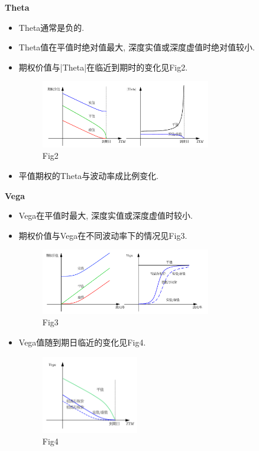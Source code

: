 \documentclass[UTF8]{ctexart}
\begin{document}
\noindent \textbf{Theta} \par 
\begin{itemize}
\item Theta通常是负的.
\item Theta值在平值时绝对值最大, 深度实值或深度虚值时绝对值较小.
\item 期权价值与|Theta|在临近到期时的变化见Fig2.
\begin{figure}[H]
    \centering
    \includegraphics[width=0.7\textwidth]{fig/fig2.png}
    \caption{Fig2}
\end{figure}
\item 平值期权的Theta与波动率成比例变化.
\end{itemize}


\noindent \textbf{Vega} \par 
\begin{itemize}
\item Vega在平值时最大, 深度实值或深度虚值时较小.
\item 期权价值与Vega在不同波动率下的情况见Fig3.
\begin{figure}[H]
    \centering
    \includegraphics[width=0.7\textwidth]{fig/fig3.png}
    \caption{Fig3}
\end{figure}
\item Vega值随到期日临近的变化见Fig4.
\begin{figure}[H]
    \centering
    \includegraphics[width=0.4\textwidth]{fig/fig4.png}
    \caption{Fig4}
\end{figure}

\end{itemize}
\end{document}
